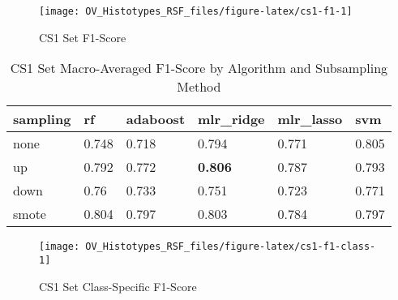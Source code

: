 \documentclass[
]{report}
\begin{document}
\begin{figure}[H]

{\centering \texttt{[image: OV\_Histotypes\_RSF\_files/figure-latex/cs1-f1-1]} 

}

\caption{CS1 Set F1-Score}\label{fig:cs1-f1}
\end{figure}

\begin{table}

\caption{\label{tab:cs1-f1-table}CS1 Set Macro-Averaged F1-Score by Algorithm and Subsampling Method}
\centering
\begin{tabular}[t]{l|l|l|l|l|l}
\hline
sampling & rf & adaboost & mlr\_ridge & mlr\_lasso & svm\\
\hline
none & 0.748 & 0.718 & 0.794 & 0.771 & 0.805\\
\hline
up & 0.792 & 0.772 & \textbf{0.806} & 0.787 & 0.793\\
\hline
down & 0.76 & 0.733 & 0.751 & 0.723 & 0.771\\
\hline
smote & 0.804 & 0.797 & 0.803 & 0.784 & 0.797\\
\hline
\end{tabular}
\end{table}

\begin{figure}[H]

{\centering \texttt{[image: OV\_Histotypes\_RSF\_files/figure-latex/cs1-f1-class-1]} 

}

\caption{CS1 Set Class-Specific F1-Score}\label{fig:cs1-f1-class}
\end{figure}
\end{document}
